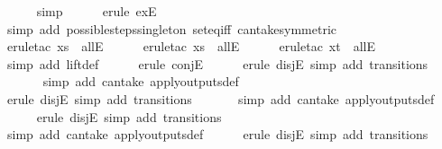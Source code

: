 \begin{isabellebody}
\ \ \ \ \isamarkupfalse%
\ simp\isanewline
\ \ \ \ \isamarkupfalse%
\ {\isacharparenleft}erule\ exE{\isacharparenright}{\isacharplus}\isanewline
\ \ \ \ \isamarkupfalse%
\ {\isacharparenleft}simp\ add{\isacharcolon}\ possible{\isacharunderscore}steps{\isacharunderscore}singleton\ set{\isacharunderscore}eq{\isacharunderscore}iff\ can{\isacharunderscore}take{\isacharbrackleft}symmetric{\isacharbrackright}{\isacharparenright}\isanewline
\ \ \ \ \isamarkupfalse%
\ {\isacharparenleft}erule{\isacharunderscore}tac\ x{\isacharequal}s\ \ allE{\isacharparenright}\isanewline
\ \ \ \ \isamarkupfalse%
\ {\isacharparenleft}erule{\isacharunderscore}tac\ x{\isacharequal}s{\isacharprime}\ \ allE{\isacharparenright}\isanewline
\ \ \ \ \isamarkupfalse%
\ {\isacharparenleft}erule{\isacharunderscore}tac\ x{\isacharequal}t\ \ allE{\isacharparenright}\isanewline
\ \ \ \ \isamarkupfalse%
\ {\isacharparenleft}simp\ add{\isacharcolon}\ lift{\isacharunderscore}def{\isacharparenright}\isanewline
\ \ \ \ \isamarkupfalse%
\ {\isacharparenleft}erule\ conjE{\isacharparenright}{\isacharplus}\isanewline
\ \ \ \ \isamarkupfalse%
\ {\isacharparenleft}erule\ disjE{\isacharcomma}\ simp\ add{\isacharcolon}\ transitions{\isacharparenright}{\isacharplus}\isanewline
\ \ \ \ \ \isamarkupfalse%
\ {\isacharparenleft}simp\ add{\isacharcolon}\ can{\isacharunderscore}take\ apply{\isacharunderscore}outputs{\isacharunderscore}def{\isacharparenright}\isanewline
\ \ \ \ \isamarkupfalse%
\ {\isacharparenleft}erule\ disjE{\isacharcomma}\ simp\ add{\isacharcolon}\ transitions{\isacharparenright}{\isacharplus}\isanewline
\ \ \ \ \ \isamarkupfalse%
\ {\isacharparenleft}simp\ add{\isacharcolon}\ can{\isacharunderscore}take\ apply{\isacharunderscore}outputs{\isacharunderscore}def{\isacharparenright}\isanewline
\ \ \ \ \isamarkupfalse%
\ {\isacharparenleft}erule\ disjE{\isacharcomma}\ simp\ add{\isacharcolon}\ transitions{\isacharparenright}{\isacharplus}\isanewline
\ \ \ \ \ \isamarkupfalse%
\ {\isacharparenleft}simp\ add{\isacharcolon}\ can{\isacharunderscore}take\ apply{\isacharunderscore}outputs{\isacharunderscore}def{\isacharparenright}\isanewline
\ \ \ \ \isamarkupfalse%
\ {\isacharparenleft}erule\ disjE{\isacharcomma}\ simp\ add{\isacharcolon}\ transitions{\isacharparenright}{\isacharplus}\isanewline

\end{isabellebody}
